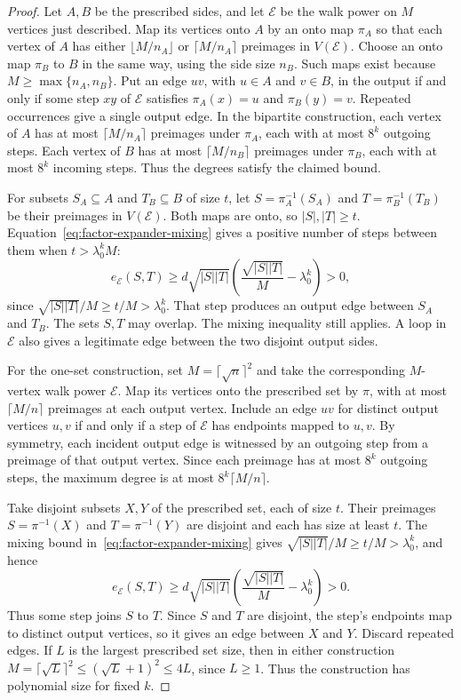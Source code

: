 \begin{proof}
Let $A,B$ be the prescribed sides, and let $\mathcal E$ be the
walk power on $M$ vertices just described. Map its vertices onto
$A$ by an onto map $\pi_A$ so that each vertex of $A$ has either
$\lfloor M/n_A\rfloor$ or $\lceil M/n_A\rceil$ preimages in
$V(\mathcal E)$. Choose an onto map $\pi_B$ to $B$ in the same way,
using the side size $n_B$. Such maps exist because
$M\ge\max\{n_A,n_B\}$.
Put an edge $uv$, with $u\in A$ and $v\in B$, in the output if
and only if some step $xy$ of $\mathcal E$ satisfies
$\pi_A(x)=u$ and $\pi_B(y)=v$.
Repeated occurrences give a single output edge.
In the bipartite construction, each vertex of $A$ has at most
$\lceil M/n_A\rceil$ preimages under $\pi_A$, each with at most
$8^k$ outgoing steps. Each vertex of $B$ has at most
$\lceil M/n_B\rceil$ preimages under $\pi_B$, each with at most
$8^k$ incoming steps. Thus the degrees satisfy the claimed bound.

For subsets $S_A\subseteq A$ and $T_B\subseteq B$ of size $t$,
let $S=\pi_A^{-1}(S_A)$ and $T=\pi_B^{-1}(T_B)$ be their preimages
in $V(\mathcal E)$. Both maps are onto, so
$|S|,|T|\ge t$. Equation~\eqref{eq:factor-expander-mixing}
gives a positive number of steps between them when
$t>\lambda_0^kM$:
\[
 e_{\mathcal E}(S,T)\ge
 d\sqrt{|S||T|}\left(\frac{\sqrt{|S||T|}}{M}-\lambda_0^k\right)>0,
\]
since $\sqrt{|S||T|}/M\ge t/M>\lambda_0^k$.
That step produces an output edge between $S_A$ and $T_B$.
The sets $S,T$ may overlap. The mixing inequality still applies. A
loop in $\mathcal E$ also gives a legitimate edge between the two
disjoint output sides.

For the one-set construction, set $M=\lceil\sqrt n\rceil^2$ and
take the corresponding $M$-vertex walk power $\mathcal E$. Map its
vertices onto the prescribed set by $\pi$, with at most
$\lceil M/n\rceil$ preimages at each output vertex. Include an edge
$uv$ for distinct output vertices $u,v$ if and only if a step of
$\mathcal E$ has endpoints mapped to $u,v$. By symmetry, each
incident output edge is witnessed by an outgoing step from a
preimage of that output vertex. Since each preimage has at most
$8^k$ outgoing steps, the maximum degree is at most
$8^k\lceil M/n\rceil$.

Take disjoint subsets $X,Y$ of the prescribed set, each of size $t$.
Their preimages $S=\pi^{-1}(X)$ and $T=\pi^{-1}(Y)$ are disjoint
and each has size at least $t$. The mixing bound
in~\eqref{eq:factor-expander-mixing} gives
$\sqrt{|S||T|}/M\ge t/M>\lambda_0^k$, and hence
\[
 e_{\mathcal E}(S,T)\ge d\sqrt{|S||T|}
 \left(\frac{\sqrt{|S||T|}}{M}-\lambda_0^k\right)>0.
\]
Thus some step joins $S$ to $T$. Since $S$ and $T$ are disjoint,
the step's endpoints map to distinct output vertices, so it gives
an edge between $X$ and $Y$. Discard repeated edges. If $L$ is the
largest prescribed set size, then in either construction
$M=\lceil\sqrt L\rceil^2\le(\sqrt L+1)^2\le4L$, since $L\ge1$.
Thus the construction has polynomial size for fixed $k$.


\end{proof}
